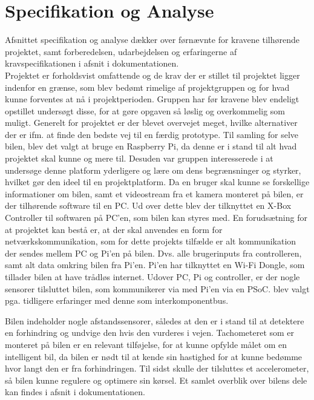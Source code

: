 \section{Specifikation og Analyse}
\label{ch:Specifikation_og_Analyse}

Afsnittet specifikation og analyse dækker over førnævnte for kravene tilhørende projektet, samt forberedelsen, udarbejdelsen og erfaringerne af kravspecifikationen i afsnit  i dokumentationen. \\

Projektet er forholdsvist omfattende og de krav der er stillet til projektet ligger indenfor en grænse, som blev bedømt rimelige af projektgruppen og for hvad kunne forventes at nå i projektperioden. 
Gruppen har før kravene blev endeligt opstillet undersøgt disse, for at gøre opgaven så løslig og overkommelig som muligt.
Generelt for projektet er der blevet overvejet meget, hvilke alternativer der er ifm. at finde den bedste vej til en færdig prototype.
Til samling for selve bilen, blev det valgt at bruge en Raspberry Pi, da denne er i stand til alt hvad projektet skal kunne og mere til. 
Desuden var gruppen interesserede i at undersøge denne platform yderligere og lære om dens begrænsninger og styrker, hvilket gør den ideel til en projektplatform.
Da en bruger skal kunne se forskellige informationer om bilen, samt et videostream fra et kamera monteret på bilen, er der tilhørende software til en PC. 
Ud over dette blev der tilknyttet en X-Box Controller til softwaren på PC'en, som bilen kan styres med.
En forudsætning for at projektet kan bestå er, at der skal anvendes en form for netværkskommunikation, som for dette projekts tilfælde er alt kommunikation der sendes mellem PC og Pi'en på bilen. Dvs. alle brugerinputs fra controlleren, samt alt data omkring bilen fra Pi'en.
Pi'en har tilknyttet en Wi-Fi Dongle, som tillader bilen at have trådløs internet. Udover PC, Pi og controller, er der nogle sensorer tilsluttet bilen, som kommunikerer via \IIC med Pi'en via en PSoC. 
\IIC blev valgt pga. tidligere erfaringer med denne som interkomponentbus. 

Bilen indeholder nogle afstandssensorer, således at den er i stand til at detektere en forhindring og undvige den hvis den vurderes i vejen. Tachometeret som er monteret på bilen er en relevant tilføjelse, for at kunne opfylde målet om en intelligent bil, da bilen er nødt til at kende sin hastighed for at kunne bedømme hvor langt den er fra forhindringen. Til sidst skulle der tilsluttes et accelerometer, så bilen kunne regulere og optimere sin kørsel. 
Et samlet overblik over bilens dele kan findes i afsnit  i dokumentationen.

\clearpage